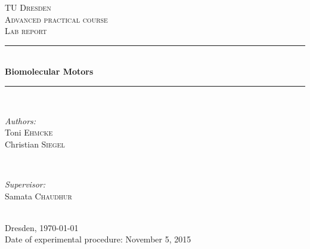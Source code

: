 \begin{titlepage}
\newcommand{\HRule}{\rule{\linewidth}{0.5mm}} %

\center %
 

\textsc{\LARGE TU Dresden}\\[1.5cm] %
\textsc{\Large Advanced practical course}\\[0.5cm] %
\textsc{\Large Lab report}\\[0.5cm] %


\HRule \\[0.7cm]
{ \huge \bfseries Biomolecular Motors}\\[0.4cm] %
\HRule \\[1.5cm]
 

\begin{minipage}{0.4\textwidth}
\begin{flushleft} \large
\emph{Authors:}\\
Toni \textsc{Ehmcke}\\
Christian \textsc{Siegel}
\end{flushleft}
\end{minipage}
~
\begin{minipage}{0.4\textwidth}
\begin{flushright} \large
\emph{Supervisor:} \\
Samata \textsc{Chaudhur} %
\end{flushright}
\end{minipage}\\[4cm]


{\large Dresden, \today}\\ %
{\large Date of experimental procedure: November 5, 2015}\\[3cm]


\vfill 

\end{titlepage}